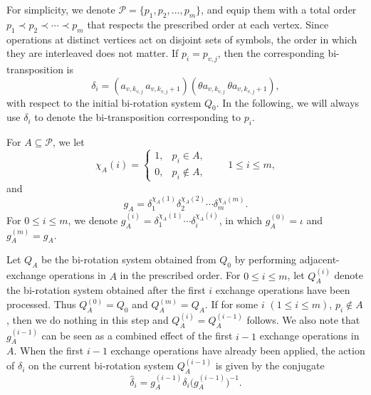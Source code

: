 \documentclass[10pt,a4paper]{amsart}
\begin{document}
For simplicity, we denote
$\mathcal P=\{p_1,p_2,\ldots,p_m\}$, and equip them with a total order $p_1\prec p_2\prec\cdots\prec p_m$
that respects the prescribed order at each vertex.
Since operations at distinct vertices act on disjoint sets of symbols, the order in which they are interleaved does not matter. If $p_i=p_{v,j}$, then the corresponding  bi-transposition is
$$
\delta_i=
(a_{v,k_{v,j}}\,a_{v,k_{v,j}+1})
(\theta a_{v,k_{v,j}}\,\theta a_{v,k_{v,j}+1}),
$$
with respect to the initial bi-rotation system $Q_0$. In the following, we will always use $\delta_i$ to denote the bi-transposition corresponding to $p_i$.

For $A\subseteq\mathcal P$, we let
$$\chi_A(i)= \begin{cases} 1, & p_i\in A,\\ 0, & p_i\notin A, \end{cases} \qquad 1\le i\le m,$$  and
$$g_A=
\delta_1^{\chi_A(1)}
\delta_2^{\chi_A(2)}
\cdots
\delta_m^{\chi_A(m)}.$$
For $0\leq i\leq m$,  we denote
$g_A^{(i)}=\delta_1^{\chi_A(1)}\cdots
\delta_i^{\chi_A(i)}$, in which $g_A^{(0)}=\iota$ and
$g_A^{(m)}=g_A$.

Let $Q_A$ be the bi-rotation system obtained from $Q_0$ by performing adjacent-exchange operations in $A$ in the prescribed order. For
$0\leq i\leq m$, let $Q_A^{(i)}$ denote the bi-rotation system obtained
after the first $i$ exchange operations have been processed. Thus
$Q_A^{(0)}=Q_0$ and $Q_A^{(m)}=Q_A$. If for some $i$ $(1\leq i \leq m)$, $p_i\notin A$, then we do nothing in this step and $Q_A^{(i)}=Q_A^{(i-1)}$ follows. We also note that $g_A^{(i-1)}$
can be seen as a combined effect of the first $i-1$ exchange operations in $A$.  When the first $i-1$ exchange operations have already been applied, the action of $\delta_i$ on the current bi-rotation system $Q_{A}^{(i-1)}$
is given by the conjugate
\[
\widehat{\delta}_i
=
g_A^{(i-1)}\delta_i
\bigl(g_A^{(i-1)}\bigr)^{-1}.
\]
\end{document}

